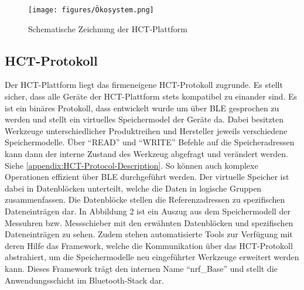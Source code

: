 \begin{figure}[H] 
	\centering
	\texttt{[image: figures/Ökosystem.png]}
	\caption{Schematische Zeichnung der \ac{HCT}-Plattform}
\end{figure}

\subsection{HCT-Protokoll}
Der \ac{HCT}-Plattform liegt das firmeneigene \ac{HCT}-Protokoll zugrunde. Es stellt sicher, dass alle Geräte der \ac{HCT}-Plattform stets kompatibel zu einander sind. Es ist ein binäres Protokoll, dass entwickelt wurde um über \ac{BLE} gesprochen zu werden und stellt ein virtuelles Speichermodel der Geräte da. Dabei besitzten Werkzeuge unterschiedlicher Produktreihen und Hersteller jeweils verschiedene Speichermodelle. Über ``READ'' und ``WRITE'' Befehle auf die Speicheradressen kann dann der interne Zustand des Werkzeug abgefragt und verändert werden. Siehe \ref{appendix:HCT-Protocol-Description}. So können auch komplexe Operationen effizient über \ac{BLE} durchgeführt werden. Der virtuelle Speicher ist dabei in Datenblöcken unterteilt, welche die Daten in logische Gruppen zusammenfassen. Die Datenblöcke stellen die Referenzadressen zu spezifischen Dateneinträgen dar. In Abbildung 2 ist ein Auszug aus dem Speichermodell der Messuhren bzw. Messschieber mit den erwähnten Datenblöcken und spezifischen Dateneinträgen zu sehen. Zudem stehen automatisierte Tools zur Verfügung mit deren Hilfe das Framework, welche die Kommunikation über das HCT-Protokoll abstrahiert, um die Speichermodelle neu eingeführter Werkzeuge erweitert werden kann. Dieses Framework trägt den internen Name ``nrf\_Base'' und stellt die Anwendungsschicht im Bluetooth-Stack dar.

